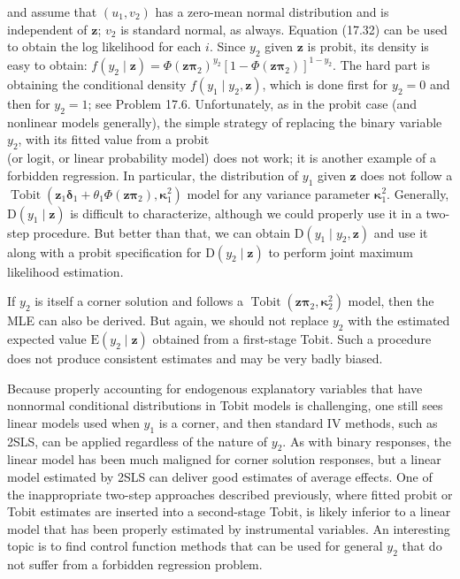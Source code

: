\documentclass[10pt]{article}
\begin{document}
and assume that $\left(u_{1}, v_{2}\right)$ has a zero-mean normal distribution and is independent of $\mathbf{z}$; $v_{2}$ is standard normal, as always. Equation (17.32) can be used to obtain the log likelihood for each $i$. Since $y_{2}$ given $\mathbf{z}$ is probit, its density is easy to obtain: $f\left(y_{2} \mid \mathbf{z}\right)= \Phi\left(\mathbf{z} \boldsymbol{\pi}_{2}\right)^{y_{2}}\left[1-\Phi\left(\mathbf{z} \boldsymbol{\pi}_{2}\right)\right]^{1-y_{2}}$. The hard part is obtaining the conditional density $f\left(y_{1} \mid y_{2}, \mathbf{z}\right)$, which is done first for $y_{2}=0$ and then for $y_{2}=1$; see Problem 17.6. Unfortunately, as in the probit case (and nonlinear models generally), the simple strategy of replacing the binary variable $y_{2}$, with its fitted value from a probit\\
(or logit, or linear probability model) does not work; it is another example of a forbidden regression. In particular, the distribution of $y_{1}$ given $\mathbf{z}$ does not follow a $\operatorname{Tobit}\left(\mathbf{z}_{1} \boldsymbol{\delta}_{1}+\theta_{1} \Phi\left(\mathbf{z} \boldsymbol{\pi}_{2}\right), \boldsymbol{\kappa}_{1}^{2}\right)$ model for any variance parameter $\boldsymbol{\kappa}_{1}^{2}$. Generally, $\mathrm{D}\left(y_{1} \mid \mathbf{z}\right)$ is difficult to characterize, although we could properly use it in a two-step procedure. But better than that, we can obtain $\mathrm{D}\left(y_{1} \mid y_{2}, \mathbf{z}\right)$ and use it along with a probit specification for $\mathrm{D}\left(y_{2} \mid \mathbf{z}\right)$ to perform joint maximum likelihood estimation.

If $y_{2}$ is itself a corner solution and follows a $\operatorname{Tobit}\left(\mathbf{z} \boldsymbol{\pi}_{2}, \boldsymbol{\kappa}_{2}^{2}\right)$ model, then the MLE can also be derived. But again, we should not replace $y_{2}$ with the estimated expected value $\mathrm{E}\left(y_{2} \mid \mathbf{z}\right)$ obtained from a first-stage Tobit. Such a procedure does not produce consistent estimates and may be very badly biased.

Because properly accounting for endogenous explanatory variables that have nonnormal conditional distributions in Tobit models is challenging, one still sees linear models used when $y_{1}$ is a corner, and then standard IV methods, such as 2SLS, can be applied regardless of the nature of $y_{2}$. As with binary responses, the linear model has been much maligned for corner solution responses, but a linear model estimated by 2SLS can deliver good estimates of average effects. One of the inappropriate two-step approaches described previously, where fitted probit or Tobit estimates are inserted into a second-stage Tobit, is likely inferior to a linear model that has been properly estimated by instrumental variables. An interesting topic is to find control function methods that can be used for general $y_{2}$ that do not suffer from a forbidden regression problem.
\end{document}
